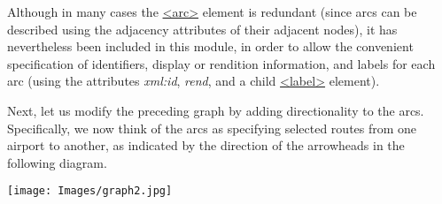 Although in many cases the \hyperref[TEI.arc]{<arc>} element is redundant (since arcs can be described using the adjacency attributes of their adjacent nodes), it has nevertheless been included in this module, in order to allow the convenient specification of identifiers, display or rendition information, and labels for each arc (using the attributes {\itshape xml:id}, {\itshape rend}, and a child \hyperref[TEI.label]{<label>} element).\par
Next, let us modify the preceding graph by adding directionality to the arcs. Specifically, we now think of the arcs as specifying selected routes from one airport to another, as indicated by the direction of the arrowheads in the following diagram.\par
 \noindent\texttt{[image: Images/graph2.jpg]}\par
